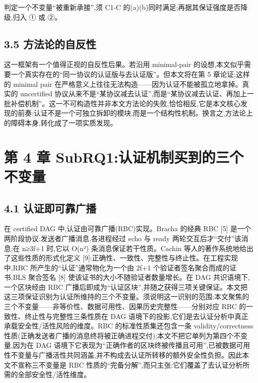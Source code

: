 \documentclass[UTF8,fontset=windows,a4paper,11pt]{ctexart}
\begin{document}
判定一个不变量``被重新承接'',须 C1-C
的(a)(b)同时满足;再据其保证强度是否降级,归入 ① 或 ②。

\subsection{3.5
方法论的自反性}\label{ux65b9ux6cd5ux8bbaux7684ux81eaux53cdux6027}

这一框架有一个值得正视的自反性后果。若沿用 minimal-pair
的设想,本文似乎需要一个真实存在的``同一协议的认证版与去认证版''。但本文将在第
5 章论证:这样的 minimal pair
在严格意义上往往无法构造------因为认证不能被孤立地拿掉。真实的
uncertified
协议从来不是``某协议减去认证'',而是``某协议减去认证、再加上一批补偿机制''。这一不可构造性并非本文方法论的失败,恰恰相反,它是本文核心发现的前奏:认证不是一个可独立拆卸的模块,而是一个结构性机制。换言之,方法论上的障碍本身,转化成了一项实质发现。

\section{第 4 章
SubRQ1:认证机制买到的三个不变量}\label{ux7b2c-4-ux7ae0-subrq1ux8ba4ux8bc1ux673aux5236ux4e70ux5230ux7684ux4e09ux4e2aux4e0dux53d8ux91cf}

\subsection{4.1
认证即可靠广播}\label{ux8ba4ux8bc1ux5373ux53efux9760ux5e7fux64ad}

在 certified DAG 中,认证由可靠广播(RBC)实现。Bracha 的经典 RBC {[}5{]}
是一个两阶段协议:发送者广播消息,各进程经过 echo 与 ready
两轮交互后才``交付''该消息;在 n≥3f+1 时,它以 O(n²)
条消息保证若干性质。Cachin 等人的著作系统地给出了这些性质的形式化定义
{[}9{]}:正确性、一致性、完整性与终止性。在工程实现中,RBC
所产生的``认证''通常物化为一个由 2f+1 个验证者签名聚合而成的证书,BLS
聚合签名 {[}8{]} 使该证书的大小不随验证者数量增长。在 DAG
共识语境下,一个区块经由 RBC
广播后即成为``认证区块'',并随之获得三项关键保证。本文把这三项保证识别为认证所维持的三个不变量。须说明这一识别的范围:本文聚焦的三个不变量------非等价性、数据可用性、因果历史完整性------分别对应
RBC 的一致性、终止性与完整性三条性质在 DAG
语境下的投影,它们是去认证分析中真正承载安全性/活性风险的维度。RBC
的标准性质集还包含一条 validity/correctness
性质(正确发送者广播的消息终将被正确进程交付);本文不把它单列为第四个不变量,因为在
DAG
语境下它表现为``正确作者的区块终被传播且可用'',已被数据可用性不变量与广播活性共同涵盖,并不构成去认证所转移的额外安全性负担。因此本文不宣称三不变量是
RBC
性质的``完备分解'',而只主张:它们覆盖了去认证分析所需的全部安全性/活性维度。
\end{document}
